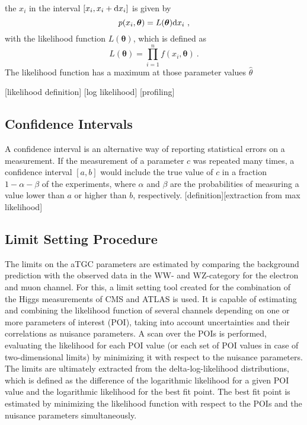 the $x_i$ in the interval $[x_i,x_i+{\rm d}x_i]$ is given by
\begin{equation}
p(x_i,\boldsymbol{\theta}) = L(\boldsymbol{\theta}) {\rm d}x_i ~,
\end{equation}
with the likelihood function $L(\boldsymbol{\theta})$, which is defined as
\begin{equation}
L(\boldsymbol{\theta}) = \prod_{i=1}^{n} f(x_i,\boldsymbol{\theta}) ~.
\end{equation}
The likelihood function has a maximum at those parameter values $\hat{\theta}$ 

[likelihood definition]
[log likelihood]
[profiling]
\subsection{Confidence Intervals}
A confidence interval is an alternative way of reporting statistical errors on a measurement. If the measurement of a parameter $c$ was repeated many times, a confidence interval $[a,b]$ would include the true value of $c$ in a fraction $1-\alpha-\beta$ of the experiments, where $\alpha$ and $\beta$ are the probabilities of measuring a value lower than $a$ or higher than $b$, respectively.
[definition][extraction from max likelihood]
\subsection{Limit Setting Procedure}
\label{subsec:limsetproc}
The limits on the aTGC parameters are estimated by comparing the background prediction with the observed data in the WW- and WZ-category for the electron and muon channel. For this, a limit setting tool created for the combination of the Higgs measurements of CMS and ATLAS \cite{combine} is used. It is capable of estimating and combining the likelihood function of several channels depending on one or more parameters of interest (POI), taking into account uncertainties and their correlations as nuisance parameters. A scan over the POIs is performed, evaluating the likelihood for each POI value (or each set of POI values in case of two-dimensional limits) by minimizing it with respect to the nuisance parameters. The limits are ultimately extracted from the delta-log-likelihood distributions, which is defined as the difference of the logarithmic likelihood for a given POI value and the logarithmic likelihood for the best fit point. The best fit point is estimated by minimizing the likelihood function with respect to the POIs and the nuisance parameters simultaneously.\\

